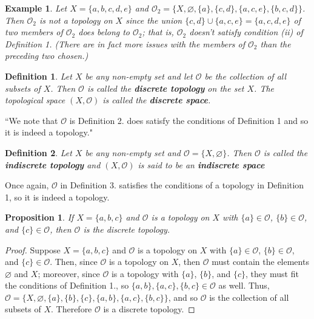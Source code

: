 \documentclass[12pt,reqno]{amsart}
\theoremstyle{plain}
\newtheorem{defi}{Definition}
\newtheorem{prop}{Proposition}
\newtheorem{ex}{Example}
\begin{document}
\begin{ex} Let $X = \{a, b, c, d, e \}$ and $\mathcal{O}_2 = \{ X, \varnothing, \{a \}, \{c, d \}, \{a, c, e \}, \{b, c, d \} \}$. Then $\mathcal{O}_2$ is not a topology on $X$ since the union $\{c, d \} \cup \{a, c, e \} = \{a, c, d, e \}$ of two members of $\mathcal{O}_2$ does belong to $\mathcal{O}_2$; that is, $\mathcal{O}_2$ doesn't satisfy condition \textup{(ii)} of Definition 1. (There are in fact more issues with the members of $\mathcal{O}_2$ than the preceding two chosen.)
\end{ex} 
\begin{defi} Let $X$ be any non-empty set and let $\mathcal{O}$ be the collection of all subsets of $X$.  Then $\mathcal{O}$ is called the \textup{\textbf{discrete topology}} on the set $X$. The topological space $(X, \mathcal{O})$ is called the \textup{\textbf{discrete space}}. 
\end{defi} 

``We note that $\mathcal{O}$ is Definition 2. does satisfy the conditions of Definition 1 and so it is indeed a topology."

\begin{defi} Let $X$ be any non-empty set and $\mathcal{O} = \{ X, \varnothing \}$. Then $\mathcal{O}$ is called the \textup{\textbf{indiscrete topology}} and $(X, \mathcal{O})$ is said to be an \textup{\textbf{indiscrete space}}
\end{defi} 

Once again, $\mathcal{O}$ in Definition 3. satisfies the conditions of a topology in Definition 1, so it is indeed a topology. 

\begin{prop} If $X = \{a, b, c \}$ and $\mathcal{O}$ is a topology on $X$ with $\{a \} \in \mathcal{O}$, $\{ b \} \in \mathcal{O}$, and $\{ c \} \in \mathcal{O}$, then $\mathcal{O}$ is the discrete topology. 
\end{prop} 
\begin{proof} Suppose $X = \{a, b, c \}$ and $\mathcal{O}$ is a topology on $X$ with $\{a \} \in \mathcal{O}$, $\{ b \} \in \mathcal{O}$, and $\{ c \} \in \mathcal{O}$. Then, since $\mathcal{O}$ is a topology on $X$, then $\mathcal{O}$ must contain the elements $\varnothing$ and $X$; moreover, since $\mathcal{O}$ is a topology with $\{a \}$, $\{b \}$, and $\{ c\}$, they must fit the conditions of Definition 1., so $\{a, b \}, \{a, c \}, \{b, c \} \in \mathcal{O}$ as well. Thus, $\mathcal{O} = \{ X, \varnothing, \{ a \}, \{b \} , \{ c \} ,\{a, b \}, \{a, c \}, \{b, c \} \}$, and so $\mathcal{O}$ is the collection of all subsets of $X$. Therefore $\mathcal{O}$ is a discrete topology. 
\end{proof}
\end{document}
